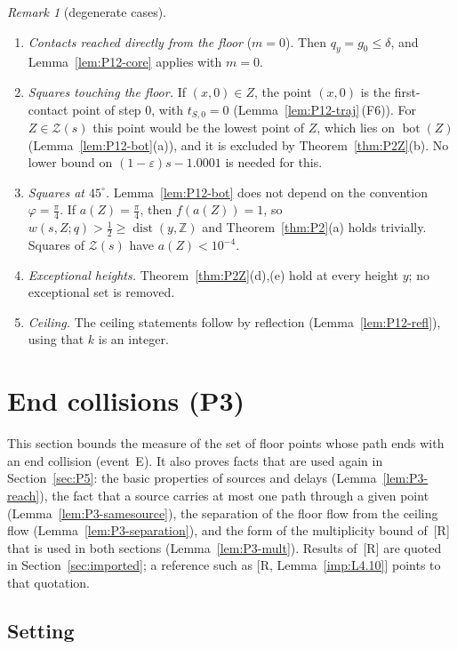 \documentclass[11pt]{amsart}
\newcommand{\Z}{\mathbb Z}
\newcommand{\eps}{\varepsilon}
\newcommand{\cZ}{\mathcal Z}
\newcommand{\Bot}{\operatorname{bot}}
\newcommand{\dist}{\operatorname{dist}}
\theoremstyle{definition}
\theoremstyle{remark}
\newtheorem{remark}[theorem]{Remark}
\numberwithin{equation}{section}
\begin{document}
\begin{remark}[degenerate cases]
\begin{enumerate}[label=\textup{(\arabic*)}]
\item \emph{Contacts reached directly from the floor} ($m=0$). Then $q_y=g_0\le\delta$, and Lemma~\ref{lem:P12-core} applies with $m=0$.
\item \emph{Squares touching the floor.} If $(x,0)\in Z$, the point $(x,0)$ is the first-contact point of step $0$, with $t_{S,0}=0$ (Lemma~\ref{lem:P12-traj}\,(F6)). For $Z\in\cZ(s)$ this point would be the lowest point of $Z$, which lies on $\Bot(Z)$ (Lemma~\ref{lem:P12-bot}(a)), and it is excluded by Theorem~\ref{thm:P2Z}(b). No lower bound on $(1-\eps)s-1.0001$ is needed for this.
\item \emph{Squares at $45^\circ$.} Lemma~\ref{lem:P12-bot} does not depend on the convention $\varphi=\frac\pi4$. If $a(Z)=\frac\pi4$, then $f(a(Z))=1$, so $w(s,Z;q)>\frac12\ge\dist(y,\Z)$ and Theorem~\ref{thm:P2}(a) holds trivially. Squares of $\cZ(s)$ have $a(Z)<10^{-4}$.
\item \emph{Exceptional heights.} Theorem~\ref{thm:P2Z}(d),(e) hold at every height $y$; no exceptional set is removed.
\item \emph{Ceiling.} The ceiling statements follow by reflection (Lemma~\ref{lem:P12-refl}), using that $k$ is an integer.
\end{enumerate}
\end{remark}

\section{End collisions (P3)}\label{sec:P3}

This section bounds the measure of the set of floor points whose path ends with an end collision (event~E). It also proves facts that are used again in Section~\ref{sec:P5}: the basic properties of sources and delays (Lemma~\ref{lem:P3-reach}), the fact that a source carries at most one path through a given point (Lemma~\ref{lem:P3-samesource}), the separation of the floor flow from the ceiling flow (Lemma~\ref{lem:P3-separation}), and the form of the multiplicity bound of~[R] that is used in both sections (Lemma~\ref{lem:P3-mult}). Results of~[R] are quoted in Section~\ref{sec:imported}; a reference such as [R, Lemma~\ref{imp:L4.10}] points to that quotation.

\subsection{Setting}\label{ssec:P3-setting}
\end{document}
